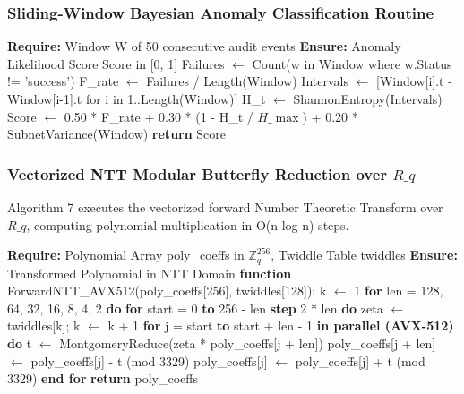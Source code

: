 \documentclass[5p,times]{elsarticle}
\begin{document}
\subsubsection{Sliding-Window Bayesian Anomaly Classification Routine}

\begin{algorithm}[!ht]
\caption{Sliding-Window Bayesian Anomaly Classification Routine}
\begin{algorithmic}[1]
  \STATE \textbf{Require:} Window W of 50 consecutive audit events
  \STATE \textbf{Ensure:} Anomaly Likelihood Score Score in [0, 1]
  \STATE Failures $\leftarrow$ Count(w in Window where w.Status != 'success')
  \STATE F\_rate $\leftarrow$ Failures / Length(Window)
  \STATE Intervals $\leftarrow$ [Window[i].t - Window[i-1].t for i in 1..Length(Window)]
  \STATE H\_t $\leftarrow$ ShannonEntropy(Intervals)
  \STATE Score $\leftarrow$ 0.50 * F\_rate + 0.30 * (1 - H\_t / $H\_{\max}$) + 0.20 * SubnetVariance(Window)
  \STATE \textbf{return} Score
\end{algorithmic}
\end{algorithm}


\subsubsection{Vectorized NTT Modular Butterfly Reduction over $R\_q$}

Algorithm 7 executes the vectorized forward Number Theoretic Transform over $R\_q$, computing polynomial multiplication in O(n log n) steps.

\begin{algorithm}[!ht]
\caption{Vectorized NTT Modular Butterfly Reduction over $R\_q$}
\begin{algorithmic}[1]
  \STATE \textbf{Require:} Polynomial Array poly\_coeffs in $\mathbb{Z}_q^{256}$, Twiddle Table twiddles
  \STATE \textbf{Ensure:} Transformed Polynomial in NTT Domain
  \STATE \textbf{function} ForwardNTT\_AVX512(poly\_coeffs[256], twiddles[128]):
  \STATE k $\leftarrow$ 1
  \STATE \textbf{for} len = 128, 64, 32, 16, 8, 4, 2 \textbf{do}
  \STATE \textbf{for} start = 0 \textbf{to} 256 - len \textbf{step} 2 * len \textbf{do}
  \STATE zeta $\leftarrow$ twiddles[k]; k $\leftarrow$ k + 1
  \STATE \textbf{for} j = start \textbf{to} start + len - 1 \textbf{in parallel (AVX-512) do}
  \STATE t $\leftarrow$ MontgomeryReduce(zeta * poly\_coeffs[j + len])
  \STATE poly\_coeffs[j + len] $\leftarrow$ poly\_coeffs[j] - t (mod 3329)
  \STATE poly\_coeffs[j] $\leftarrow$ poly\_coeffs[j] + t (mod 3329)
  \STATE \textbf{end for}
  \STATE \textbf{return} poly\_coeffs
\end{algorithmic}
\end{algorithm}
\end{document}
